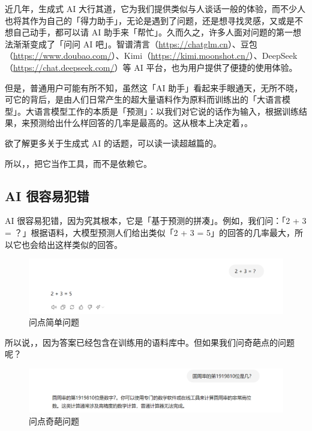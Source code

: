 近几年，生成式 AI 大行其道，它为我们提供类似与人谈话一般的体验，而不少人也将其作为自己的「得力助手」，无论是遇到了问题，还是想寻找灵感，又或是不想自己动手，都可以请 AI 助手来「帮忙」。久而久之，许多人面对问题的第一想法渐渐变成了「问问 AI 吧」。智谱清言（\url{https://chatglm.cn}）、豆包（\url{https://www.doubao.com/}）、Kimi（\url{https://kimi.moonshot.cn/}）、DeepSeek（\url{https://chat.deepseek.com/}）等 AI 平台，也为用户提供了便捷的使用体验。

但是，普通用户可能有所不知，虽然这「AI 助手」看起来手眼通天，无所不晓，可它的背后，是由人们日常产生的超大量语料作为原料而训练出的「大语言模型」。大语言模型工作的本质是「预测」：以我们对它说的话作为输入，根据训练结果，来预测给出什么样回答的几率是最高的。这从根本上决定着，。

\begin{note}
  欲了解更多关于生成式 AI 的话题，可以读一读超越篇的。
\end{note}

所以，，把它当作工具，而不是依赖它。

\subsection{AI 很容易犯错}

AI 很容易犯错，因为究其根本，它是「基于预测的拼凑」。例如，我们问：「2 + 3 = ？」根据语料，大模型预测人们给出类似「2 + 3 = 5」的回答的几率最大，所以它也会给出这样类似的回答。

\begin{figure}[htb!]
  \centering
  \includegraphics[width=.8\textwidth]{assets/basic/2+3.png}
  \caption{问点简单问题}
  \label{fig:2_plus_3}
\end{figure}

所以说，，因为答案已经包含在训练用的语料库中。但如果我们问奇葩点的问题呢？

\begin{figure}[htb!]
  \centering
  \includegraphics[width=.9\textwidth]{assets/basic/191810th_of_pi.png}
  \caption{问点奇葩问题}
  \label{fig:191810th_of_pi}
\end{figure}

